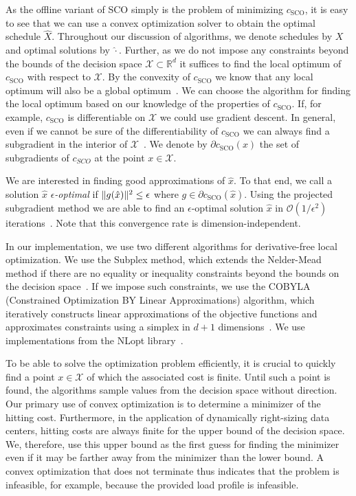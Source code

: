 As the offline variant of SCO simply is the problem of minimizing $c_{\text{SCO}}$, it is easy to see that we can use a convex optimization solver to obtain the optimal schedule $\hat{X}$. Throughout our discussion of algorithms, we denote schedules by $X$ and optimal solutions by $\hat{\cdot}$. Further, as we do not impose any constraints beyond the bounds of the decision space $\mathcal{X} \subset \mathbb{R}^d$ it suffices to find the local optimum of $c_{\text{SCO}}$ with respect to $\mathcal{X}$. By the convexity of $c_{\text{SCO}}$ we know that any local optimum will also be a global optimum~\cite{Bubeck2015}. We can choose the algorithm for finding the local optimum based on our knowledge of the properties of $c_{\text{SCO}}$. If, for example, $c_{\text{SCO}}$ is differentiable on $\mathcal{X}$ we could use gradient descent. In general, even if we cannot be sure of the differentiability of $c_{\text{SCO}}$ we can always find a subgradient in the interior of $\mathcal{X}$~\cite{Bubeck2015}. We denote by $\partial c_{\text{SCO}}(x)$ the set of subgradients of $c_{SCO}$ at the point $x \in \mathcal{X}$.

We are interested in finding good approximations of $\hat{x}$. To that end, we call a solution $\hat{x}$ \emph{$\epsilon$-optimal} if $\lVert g(\hat{x})\rVert^2 \leq \epsilon$ where $g \in \partial c_{\text{SCO}}(\hat{x})$. Using the projected subgradient method we are able to find an $\epsilon$-optimal solution $\hat{x}$ in $\mathcal{O}(1 / \epsilon^2)$ iterations~\cite{Boyd2003}. Note that this convergence rate is dimension-independent.

In our implementation, we use two different algorithms for derivative-free local optimization. We use the Subplex method, which extends the Nelder-Mead method if there are no equality or inequality constraints beyond the bounds on the decision space~\cite{Rowan1990}. If we impose such constraints, we use the COBYLA (Constrained Optimization BY Linear Approximations) algorithm, which iteratively constructs linear approximations of the objective functions and approximates constraints using a simplex in $d+1$ dimensions~\cite{Powell1994, Powell1998}. We use implementations from the NLopt library~\cite{Johnson}.

To be able to solve the optimization problem efficiently, it is crucial to quickly find a point $x \in \mathcal{X}$ of which the associated cost is finite. Until such a point is found, the algorithms sample values from the decision space without direction. Our primary use of convex optimization is to determine a minimizer of the hitting cost. Furthermore, in the application of dynamically right-sizing data centers, hitting costs are always finite for the upper bound of the decision space. We, therefore, use this upper bound as the first guess for finding the minimizer even if it may be farther away from the minimizer than the lower bound. A convex optimization that does not terminate thus indicates that the problem is infeasible, for example, because the provided load profile is infeasible.

